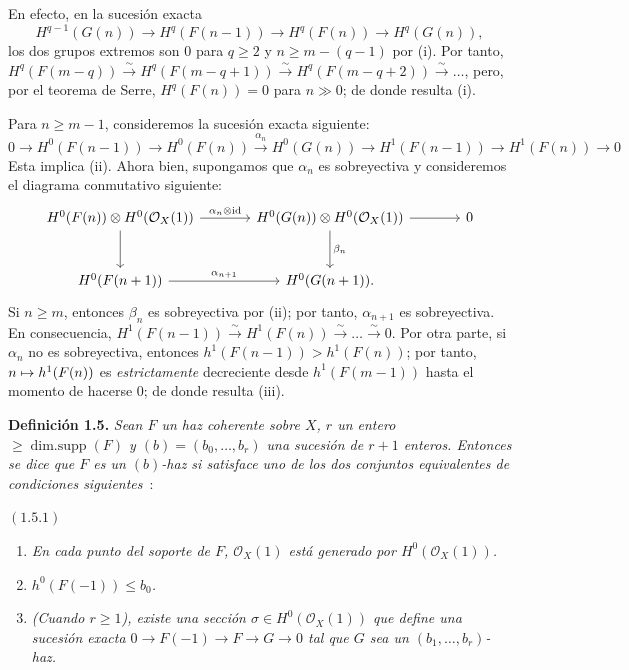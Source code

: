 En efecto, en la sucesión exacta
\[
H^{q-1}(G(n))\longrightarrow H^q(F(n-1))\longrightarrow H^q(F(n))\longrightarrow H^q(G(n)),
\]
los dos grupos extremos son \(0\) para \(q\ge2\) y
\(n\ge m-(q-1)\) por  (i). Por tanto, %
\(H^q(F(m-q))\xrightarrow{\sim}H^q(F(m-q+1))\xrightarrow{\sim}H^q(F(m-q+2))\xrightarrow{\sim}\ldots\),
pero, por el teorema de Serre, \(H^q(F(n))=0\) para \(n\gg0\); de donde
resulta (i).

Para \(n\ge m-1\), consideremos la sucesión exacta siguiente:
\[
0\to H^0(F(n-1))\to H^0(F(n))
  \xrightarrow{\alpha_n}H^0(G(n))\to H^1(F(n-1))
  \to H^1(F(n))\to0
\]
Esta implica (ii). Ahora bien, supongamos que \(\alpha_n\) es sobreyectiva y
consideremos el diagrama conmutativo siguiente:
\[
\begin{tikzcd}[column sep=large,row sep=large]
H^0(F(n))\otimes H^0(\mathcal O_X(1))
  \arrow[r,"\alpha_n\otimes\mathrm{id}"]
  \arrow[d]
& H^0(G(n))\otimes H^0(\mathcal O_X(1))
  \arrow[r]
  \arrow[d,"\beta_n"]
& 0 \\
H^0(F(n+1))
  \arrow[r,"\alpha_{n+1}"]
& H^0(G(n+1)).
\end{tikzcd}
\]
Si \(n\ge m\), entonces \(\beta_n\) es sobreyectiva por  (ii); por tanto, %
\(\alpha_{n+1}\) es sobreyectiva. En consecuencia,
\(H^1(F(n-1))\xrightarrow{\sim}H^1(F(n))\xrightarrow{\sim}\ldots\xrightarrow{\sim}0\).
Por otra parte, si \(\alpha_n\) no es sobreyectiva, entonces
\(h^1(F(n-1))>h^1(F(n))\); por tanto, \(\sisi{\mapsto n^1(F(n))}{n\mapsto h^1(F(n))}\) es %
\emph{estrictamente} decreciente desde \(h^1(F(m-1))\) hasta el momento de
hacerse \(0\); de donde resulta (iii).

\textbf{Definición 1.5.} \emph{Sean \(F\) un haz coherente sobre \(X\),
\(r\) un entero \(\ge\operatorname{dim{.}supp}(F)\) y
\((b)=(b_0,\ldots,b_r)\) una sucesión de \(r+1\) enteros. Entonces se dice
que \(F\) es un \emph{\((b)\)-haz} si satisface uno de los dos conjuntos
equivalentes de condiciones siguientes}~:

\((1.5.1)\)
\begin{enumerate}[label=(\roman*)]
\item \emph{En cada punto del soporte de \(F\), \(\mathcal O_X(1)\) está
generado por \(H^0(\mathcal O_X(1))\).}
\item \emph{\(h^0(F(-1))\le b_0\).}
\item \emph{(Cuando \(r\ge1\)), existe una sección
\(\sigma\in H^0(\mathcal O_X(1))\) que define una sucesión exacta
\(0\to F(-1)\to F\to G\to0\) tal que \(G\) sea un
\((b_1,\ldots,b_r)\)-haz.}
\end{enumerate}

